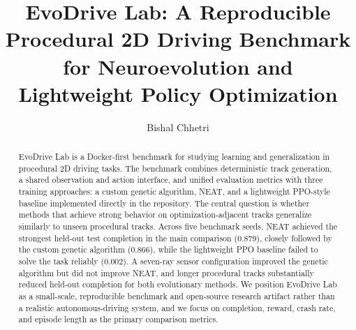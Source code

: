 \documentclass[11pt]{article}
\title{EvoDrive Lab: A Reproducible Procedural 2D Driving Benchmark for Neuroevolution and Lightweight Policy Optimization}
\author{Bishal Chhetri}
\date{}
\begin{document}
\maketitle

\begin{abstract}
EvoDrive Lab is a Docker-first benchmark for studying learning and generalization in procedural 2D driving tasks. The benchmark combines deterministic track generation, a shared observation and action interface, and unified evaluation metrics with three training approaches: a custom genetic algorithm, NEAT, and a lightweight PPO-style baseline implemented directly in the repository. The central question is whether methods that achieve strong behavior on optimization-adjacent tracks generalize similarly to unseen procedural tracks. Across five benchmark seeds, NEAT achieved the strongest held-out test completion in the main comparison (0.879), closely followed by the custom genetic algorithm (0.866), while the lightweight PPO baseline failed to solve the task reliably (0.002). A seven-ray sensor configuration improved the genetic algorithm but did not improve NEAT, and longer procedural tracks substantially reduced held-out completion for both evolutionary methods. We position EvoDrive Lab as a small-scale, reproducible benchmark and open-source research artifact rather than a realistic autonomous-driving system, and we focus on completion, reward, crash rate, and episode length as the primary comparison metrics.
\end{abstract}











\end{document}
